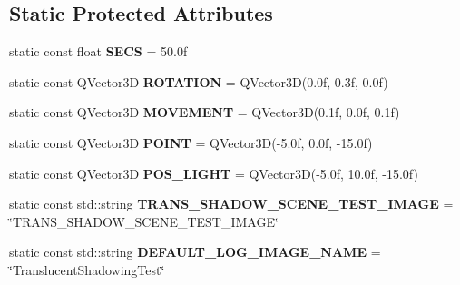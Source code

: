 \subsection*{Static Protected Attributes}
\begin{DoxyCompactItemize}
\item 
\mbox{\label{class_unit_test_1_1_c_translucent_shadowing_test_a3c6db73bed1795598dcec4a0d1f7a616}} 
static const float {\bfseries S\+E\+CS} = 50.\+0f
\item 
\mbox{\label{class_unit_test_1_1_c_translucent_shadowing_test_a5b12e85d53f6413eeabb70f0aa23d017}} 
static const Q\+Vector3D {\bfseries R\+O\+T\+A\+T\+I\+ON} = Q\+Vector3D(0.\+0f, 0.\+3f, 0.\+0f)
\item 
\mbox{\label{class_unit_test_1_1_c_translucent_shadowing_test_aadf508353dd493503af97700b95eccf0}} 
static const Q\+Vector3D {\bfseries M\+O\+V\+E\+M\+E\+NT} = Q\+Vector3D(0.\+1f, 0.\+0f, 0.\+1f)
\item 
\mbox{\label{class_unit_test_1_1_c_translucent_shadowing_test_a01fb6c0f7a79af7ca28c6162c18c7fae}} 
static const Q\+Vector3D {\bfseries P\+O\+I\+NT} = Q\+Vector3D(-\/5.\+0f, 0.\+0f, -\/15.\+0f)
\item 
\mbox{\label{class_unit_test_1_1_c_translucent_shadowing_test_a8d11e373ff78746caead82b12f5bb949}} 
static const Q\+Vector3D {\bfseries P\+O\+S\+\_\+\+L\+I\+G\+HT} = Q\+Vector3D(-\/5.\+0f, 10.\+0f, -\/15.\+0f)
\item 
\mbox{\label{class_unit_test_1_1_c_translucent_shadowing_test_ad9e53c211e68c99803a525fe471788cb}} 
static const std\+::string {\bfseries T\+R\+A\+N\+S\+\_\+\+S\+H\+A\+D\+O\+W\+\_\+\+S\+C\+E\+N\+E\+\_\+\+T\+E\+S\+T\+\_\+\+I\+M\+A\+GE} = \char`\"{}T\+R\+A\+N\+S\+\_\+\+S\+H\+A\+D\+O\+W\+\_\+\+S\+C\+E\+N\+E\+\_\+\+T\+E\+S\+T\+\_\+\+I\+M\+A\+GE\char`\"{}
\item 
\mbox{\label{class_unit_test_1_1_c_translucent_shadowing_test_a46d16e68f2de1dce84824b183650d7cd}} 
static const std\+::string {\bfseries D\+E\+F\+A\+U\+L\+T\+\_\+\+L\+O\+G\+\_\+\+I\+M\+A\+G\+E\+\_\+\+N\+A\+ME} = \char`\"{}Translucent\+Shadowing\+Test\char`\"{}
\end{DoxyCompactItemize}


